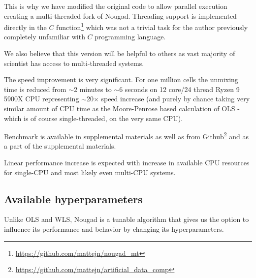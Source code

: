 This is why we have modified the original code to allow parallel execution creating a multi-threaded fork of Nougad. Threading support is implemented directly in the $C$ function\footnote{\url{https://github.com/mattejn/nougad_mt}} which was not a trivial task for the author previously completely unfamiliar with $C$ programming language.

We also believe that this version will be helpful to others as vast majority of scientist has access to multi-threaded systems.

The speed improvement is very significant. For one million cells the unmixing time is reduced from $\sim$2 minutes to $\sim$6 seconds on 12 core/24 thread Ryzen 9 5900X CPU representing $\sim$20$\times$ speed increase (and purely by chance taking very similar amount of CPU time as the Moore-Penrose based calculation of OLS - which is of course single-threaded, on the very same CPU). 

Benchmark is available in supplemental materials as well as from Github\footnote{\url{https://github.com/mattejn/artificial_data_comp}} and as a part of the supplemental materials.

Linear performance increase is expected with increase in available CPU resources for single-CPU and most likely even multi-CPU systems.
 
\subsection{Available hyperparameters}
 
 Unlike OLS and WLS, Nougad is a tunable algorithm that gives us the option to influence its performance and behavior by changing its hyperparameters.
 
